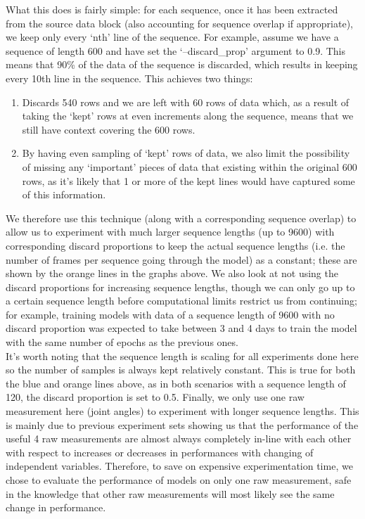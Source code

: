 \documentclass[12pt,twoside]{report}
\begin{document}
\quad What this does is fairly simple: for each sequence, once it has been extracted from the source data block (also accounting for sequence overlap if appropriate), we keep only every ‘nth’ line of the sequence. For example, assume we have a sequence of length 600 and have set the ‘--discard\_prop’ argument to 0.9. This means that 90\% of the data of the sequence is discarded, which results in keeping every 10th line in the sequence. This achieves two things:

\begin{enumerate}
	\item Discards 540 rows and we are left with 60 rows of data which, as a result of taking the ‘kept’ rows at even increments along the sequence, means that we still have context covering the 600 rows.
	\item By having even sampling of ‘kept’ rows of data, we also limit the possibility of missing any ‘important’ pieces of data that existing within the original 600 rows, as it’s likely that 1 or more of the kept lines would have captured some of this information.
\end{enumerate}

\quad We therefore use this technique (along with a corresponding sequence overlap) to allow us to experiment with much larger sequence lengths (up to 9600) with corresponding discard proportions to keep the actual sequence lengths (i.e. the number of frames per sequence going through the model) as a constant; these are shown by the orange lines in the graphs above. We also look at not using the discard proportions for increasing sequence lengths, though we can only go up to a certain sequence length before computational limits restrict us from continuing; for example, training models with data of a sequence length of 9600 with no discard proportion was expected to take between 3 and 4 days to train the model with the same number of epochs as the previous ones.\\

\quad It’s worth noting that the sequence length is scaling for all experiments done here so the number of samples is always kept relatively constant. This is true for both the blue and orange lines above, as in both scenarios with a sequence length of 120, the discard proportion is set to 0.5. Finally, we only use one raw measurement here (joint angles) to experiment with longer sequence lengths. This is mainly due to previous experiment sets showing us that the performance of the useful 4 raw measurements are almost always completely in-line with each other with respect to increases or decreases in performances with changing of independent variables. Therefore, to save on expensive experimentation time, we chose to evaluate the performance of models on only one raw measurement, safe in the knowledge that other raw measurements will most likely see the same change in performance.
\end{document}
